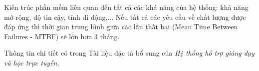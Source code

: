 \documentclass[./../main_file.tex]{subfiles}
\begin{document}
	Kiến trúc phần mềm liên quan đến tất cả các khả năng của hệ thống: khả năng mở rộng, độ tin cậy, tính di động,... Nếu tất cả các yêu cầu về chất lượng được đáp ứng thì thời gian trung bình giữa các lần thất bại (Mean Time Between Failures - MTBF) sẽ lớn hơn 3 tháng.
	
	
	Thông tin chi tiết có trong Tài liệu đặc tả bổ sung của \textit{Hệ thống hỗ trợ giảng dạy và học trực tuyến.}
\end{document}
